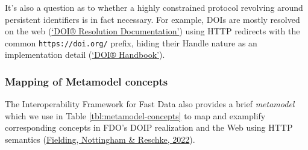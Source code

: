It's also a question as to whether a highly constrained protocol revolving around persistent identifiers is in fact necessary. For example, DOIs are mostly resolved on the web (\protect\hyperlink{ref-1H9iQhQYq}{{`DOI® Resolution Documentation'}}) using HTTP redirects with the common \texttt{https://doi.org/} prefix, hiding their Handle nature as an implementation detail (\protect\hyperlink{ref-68fzID2k}{{`DOI® Handbook'}}).

\hypertarget{mapping-of-metamodel-concepts}{%
\subsubsection{Mapping of Metamodel concepts}\label{mapping-of-metamodel-concepts}}

The Interoperability Framework for Fast Data also provides a brief \emph{metamodel} which we use in Table \ref{tbl:metamodel-concepts} to map and examplify corresponding concepts in FDO's DOIP realization and the Web using HTTP semantics (\protect\hyperlink{ref-8HJqcF1Q}{Fielding, Nottingham \& Reschke, 2022}).

